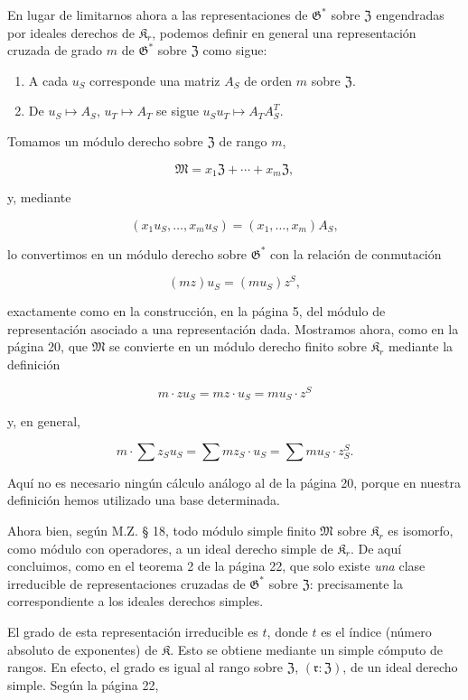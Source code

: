 En lugar de limitarnos ahora a las representaciones de \(\mathfrak G^*\) sobre \(\mathfrak Z\) engendradas por ideales derechos de \(\mathfrak K_r\), podemos definir en general una representación cruzada de grado \(m\) de \(\mathfrak G^*\) sobre \(\mathfrak Z\) como sigue:

\begin{enumerate}
\item A cada \(u_S\) corresponde una matriz \(A_S\) de orden \(m\) sobre \(\mathfrak Z\).
\item De \(u_S \mapsto A_S\), \(u_T \mapsto A_T\) se sigue \(u_Su_T \mapsto A_TA_S^T\).
\end{enumerate}

Tomamos un módulo derecho sobre \(\mathfrak Z\) de rango \(m\),

\[\mathfrak M=x_1\mathfrak Z+\cdots+x_m\mathfrak Z,\]

y, mediante

\[(x_1u_S,\ldots,x_mu_S)=(x_1,\ldots,x_m)A_S,\]

lo convertimos en un módulo derecho sobre \(\mathfrak G^*\) con la relación de conmutación

\[(mz) u_S = (mu_S) z^S,\]

exactamente como en la construcción, en la página 5, del módulo de representación asociado a una representación dada. Mostramos ahora, como en la página 20, que \(\mathfrak M\) se convierte en un módulo derecho finito sobre \(\mathfrak K_r\) mediante la definición

\[m \cdot z u_S = mz \cdot u_S = mu_S \cdot z^S\]

y, en general,

\[m \cdot \sum z_S u_S = \sum m z_S \cdot u_S = \sum m u_S \cdot z_S^S.\]

Aquí no es necesario ningún cálculo análogo al de la página 20, porque en nuestra definición hemos utilizado una base determinada.

Ahora bien, según M.Z. § 18, todo módulo simple finito \(\mathfrak M\) sobre \(\mathfrak K_r\) es isomorfo, como módulo con operadores, a un ideal derecho simple de \(\mathfrak K_r\). De aquí concluimos, como en el teorema 2 de la página 22, que solo existe \emph{una} clase irreducible de representaciones cruzadas de \(\mathfrak G^*\) sobre \(\mathfrak Z\): precisamente la correspondiente a los ideales derechos simples.

El grado de esta representación irreducible es \(t\), donde \(t\) es el índice (número absoluto de exponentes) de \(\mathfrak K\). Esto se obtiene mediante un simple cómputo de rangos. En efecto, el grado es igual al rango sobre \(\mathfrak Z\), \((\mathfrak r:\mathfrak Z)\), de un ideal derecho simple. Según la página 22,


